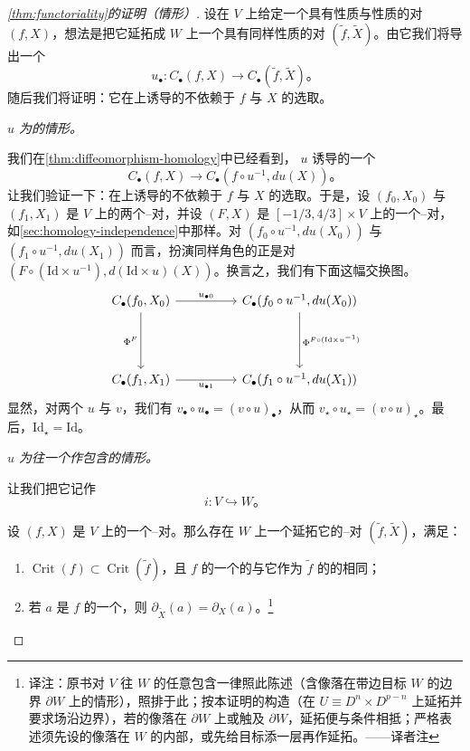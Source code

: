 \begin{proof}[\cref{thm:functoriality}的证明（\trEmbedding{}情形）]
设在 $V$ 上给定一个具有\trMorse{}性质与\trSmale{}性质的对 $(f,X)$，想法是把它延拓成 $W$ 上一个具有同样性质的对 $(\widetilde f,\widetilde X)$。由它我们将导出一个\trComplex{}\trMorphism
\[
u_\bullet\colon C_\bullet(f,X)\longrightarrow C_\bullet(\widetilde f,\widetilde X)\text{。}
\]
随后我们将证明：它在\trHomology{}上诱导的\trMorphism{}不依赖于 $f$ 与 $X$ 的选取。

\emph{$u$ 为\trDiffeomorphism{}的情形。}

我们在\cref{thm:diffeomorphism-homology}中已经看到，\trDiffeomorphism{} $u$ 诱导\trComplex{}的一个\trIsomorphism
\[
C_\bullet(f,X)\longrightarrow C_\bullet(f\circ u^{-1},du(X))\text{。}
\]
让我们验证一下：在\trHomology{}上诱导的\trIsomorphism{}不依赖于 $f$ 与 $X$ 的选取。于是，设 $(f_0,X_0)$ 与 $(f_1,X_1)$ 是 $V$ 上的两个\trMorse--\trSmale{}对，并设 $(F,X)$ 是 $[-1/3,4/3]\times V$ 上的一个\trMorse--\trSmale{}对，如\cref{sec:homology-independence}中那样。对 $(f_0\circ u^{-1},du(X_0))$ 与 $(f_1\circ u^{-1},du(X_1))$ 而言，扮演同样角色的正是对 $(F\circ(\mathrm{Id}\times u^{-1}),d(\mathrm{Id}\times u)(X))$。换言之，我们有下面这幅交换图。
\[
\begin{tikzcd}[column sep=1.7cm,row sep=1.55cm]
C_\bullet(f_0,X_0) \ar[r,"u_{\bullet 0}"] \ar[d,"\Phi^F"']
  & C_\bullet(f_0\circ u^{-1},du(X_0)) \ar[d,"\Phi^{F\circ(\mathrm{Id}\times u^{-1})}"] \\
C_\bullet(f_1,X_1) \ar[r,"u_{\bullet 1}"']
  & C_\bullet(f_1\circ u^{-1},du(X_1))
\end{tikzcd}
\]
显然，对两个\trDiffeomorphism{} $u$ 与 $v$，我们有 $v_\bullet\circ u_\bullet=(v\circ u)_\bullet$，从而 $v_\star\circ u_\star=(v\circ u)_\star$。最后，$\mathrm{Id}_\star=\mathrm{Id}$。

\emph{$u$ 为往一个\trSubmanifold{}作包含的情形。}

让我们把它记作
\[
i\colon V\hookrightarrow W\text{。}
\]

\begin{proposition}\label{thm:morse-smale-extension}
设 $(f,X)$ 是 $V$ 上的一个\trMorse--\trSmale{}对。那么存在 $W$ 上一个延拓它的\trMorse--\trSmale{}对 $(\widetilde f,\widetilde X)$，满足：
\begin{enumerate}[label=(\arabic*)]
\item $\operatorname{Crit}(f)\subset\operatorname{Crit}(\widetilde f)$，且 $f$ 的一个\trCriticalPoint{}的\trIndex{}与它作为 $\widetilde f$ 的\trCriticalPoint{}的\trIndex{}相同；
\item 若 $a$ 是 $f$ 的一个\trCriticalPoint，则 $\partial_{\widetilde X}(a)=\partial_X(a)$。\footnote{译注：原书对 $V$ 往 $W$ 的任意\trSubmanifold{}包含一律照此陈述（含像落在带边目标 $W$ 的边界 $\partial W$ 上的情形），照排于此；按本证明的构造（在 $U\equiv D^n\times D^{p-n}$ 上延拓并要求场沿边界\trIncoming），若\trEmbedding{}的像落在 $\partial W$ 上或触及 $\partial W$，延拓便与\trIncoming{}条件相抵；严格表述须先设\trEmbedding{}的像落在 $W$ 的内部，或先给目标添一层\trCollar{}再作延拓。——译者注}
\end{enumerate}
\end{proposition}


\end{proof}
